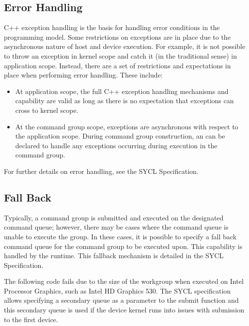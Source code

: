 \documentclass[letterpaper,10pt,english]{sphinxmanual}
\begin{document}
\subsection{Error Handling}
\label{\detokenize{programming-model/error-handling:error-handling}}\label{\detokenize{programming-model/error-handling:id1}}\label{\detokenize{programming-model/error-handling::doc}}
C++ exception handling is the basis for handling error conditions in the
programming model. Some restrictions on exceptions are in place due to
the asynchronous nature of host and device execution. For example, it is
not possible to throw an exception in kernel scope and catch it (in the
traditional sense) in application scope. Instead, there are a set of
restrictions and expectations in place when performing error handling.
These include:
\begin{itemize}
\item {} 
At application scope, the full C++ exception handling mechanisms and
capability are valid as long as there is no expectation that
exceptions can cross to kernel scope.

\item {} 
At the command group scope, exceptions are asynchronous with respect
to the application scope. During command group construction, an
 can be declared to handle any exceptions occurring
during execution in the command group.

\end{itemize}

For further details on error handling, see the SYCL Specification.


\subsection{Fall Back}
\label{\detokenize{programming-model/fall-back:fall-back}}\label{\detokenize{programming-model/fall-back:id1}}\label{\detokenize{programming-model/fall-back::doc}}
Typically, a command group is submitted and executed on the designated
command queue; however, there may be cases where the command queue is
unable to execute the group. In these cases, it is possible to specify a
fall back command queue for the command group to be executed upon. This
capability is handled by the runtime. This fallback mechanism is
detailed in the SYCL Specification.

The following code fails due to the size of the workgroup when executed
on Intel Processor Graphics, such as Intel HD Graphics 530. The SYCL
specification allows specifying a secondary queue as a parameter to the
submit function and this secondary queue is used if the device kernel
runs into issues with submission to the first device.
\end{document}
